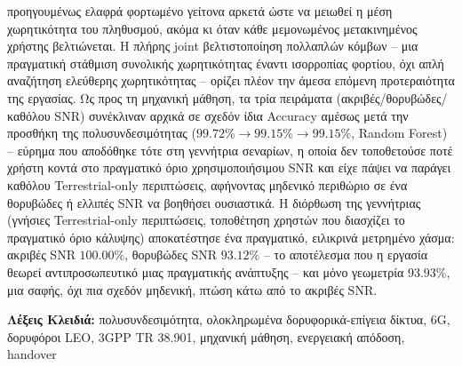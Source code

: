 προηγουμένως ελαφρά φορτωμένο γείτονα αρκετά ώστε να μειωθεί η μέση
χωρητικότητα του πληθυσμού, ακόμα κι όταν κάθε μεμονωμένος μετακινημένος
χρήστης βελτιώνεται. Η πλήρης joint βελτιστοποίηση πολλαπλών κόμβων --
μια πραγματική στάθμιση συνολικής χωρητικότητας έναντι ισορροπίας
φορτίου, όχι απλή αναζήτηση ελεύθερης χωρητικότητας -- ορίζει πλέον την
άμεσα επόμενη προτεραιότητα της εργασίας. Ως προς τη
μηχανική μάθηση, τα τρία πειράματα (ακριβές/θορυβώδες/καθόλου SNR)
συνέκλιναν αρχικά σε σχεδόν ίδια Accuracy αμέσως μετά την προσθήκη της
πολυσυνδεσιμότητας ($99.72\%\rightarrow99.15\%\rightarrow99.15\%$,
Random Forest) -- εύρημα που αποδόθηκε τότε στη γεννήτρια σεναρίων, η
οποία δεν τοποθετούσε ποτέ χρήστη κοντά στο πραγματικό όριο
χρησιμοποιήσιμου SNR και είχε πάψει να παράγει καθόλου Terrestrial-only
περιπτώσεις, αφήνοντας μηδενικό περιθώριο σε ένα θορυβώδες ή ελλιπές SNR
να βοηθήσει ουσιαστικά. Η διόρθωση της γεννήτριας (γνήσιες
Terrestrial-only περιπτώσεις, τοποθέτηση χρηστών που διασχίζει το
πραγματικό όριο κάλυψης) αποκατέστησε ένα πραγματικό, ειλικρινά
μετρημένο χάσμα: ακριβές SNR $100.00\%$, θορυβώδες SNR $93.12\%$ -- το
αποτέλεσμα που η εργασία θεωρεί αντιπροσωπευτικό μιας πραγματικής
ανάπτυξης -- και μόνο γεωμετρία $93.93\%$, μια σαφής, όχι πια σχεδόν
μηδενική, πτώση κάτω από το ακριβές SNR.

\vspace{1em}
\noindent\textbf{Λέξεις Κλειδιά:} πολυσυνδεσιμότητα, ολοκληρωμένα
δορυφορικά-επίγεια δίκτυα, 6G, δορυφόροι LEO, 3GPP TR 38.901, μηχανική
μάθηση, ενεργειακή απόδοση, handover
